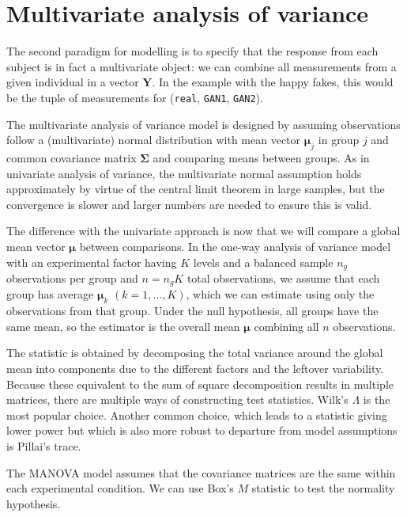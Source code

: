 \documentclass[
  11pt,
  letterpaper,
]{scrbook}
\theoremstyle{definition}
\theoremstyle{remark}
\begin{document}
\hypertarget{multivariate-analysis-of-variance}{%
\section{Multivariate analysis of
variance}\label{multivariate-analysis-of-variance}}

The second paradigm for modelling is to specify that the response from
each subject is in fact a multivariate object: we can combine all
measurements from a given individual in a vector \(\boldsymbol{Y}\). In
the example with the happy fakes, this would be the tuple of
measurements for (\texttt{real}, \texttt{GAN1}, \texttt{GAN2}).

The multivariate analysis of variance model is designed by assuming
observations follow a (multivariate) normal distribution with mean
vector \(\boldsymbol{\mu}_j\) in group \(j\) and common covariance
matrix \(\boldsymbol{\Sigma}\) and comparing means between groups. As in
univariate analysis of variance, the multivariate normal assumption
holds approximately by virtue of the central limit theorem in large
samples, but the convergence is slower and larger numbers are needed to
ensure this is valid.

The difference with the univariate approach is now that we will compare
a global mean vector \(\boldsymbol{\mu}\) between comparisons. In the
one-way analysis of variance model with an experimental factor having
\(K\) levels and a balanced sample \(n_g\) observations per group and
\(n=n_gK\) total observations, we assume that each group has average
\(\boldsymbol{\mu}_k\) \((k=1, \ldots, K)\), which we can estimate using
only the observations from that group. Under the null hypothesis, all
groups have the same mean, so the estimator is the overall mean
\(\boldsymbol{\mu}\) combining all \(n\) observations.

The statistic is obtained by decomposing the total variance around the
global mean into components due to the different factors and the
leftover variability. Because these equivalent to the sum of square
decomposition results in multiple matrices, there are multiple ways of
constructing test statistics. Wilk's \(\Lambda\) is the most popular
choice. Another common choice, which leads to a statistic giving lower
power but which is also more robust to departure from model assumptions
is Pillai's trace.

The MANOVA model assumes that the covariance matrices are the same
within each experimental condition. We can use Box's \(M\) statistic to
test the normality hypothesis.
\end{document}
